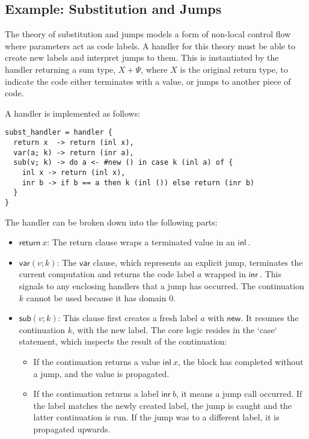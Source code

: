 \documentclass{article}
\theoremstyle{definition}
\theoremstyle{remark}
\newcommand\new{\mathsf{new}}
\newcommand\ret[1]{{\mathsf{return} \ #1}}
\newcommand\sub{\mathsf{sub}}
\newcommand\var{\mathsf{var}}
\newcommand\inl[1]{{\mathsf{inl} \ #1}}
\newcommand\inr[1]{{\mathsf{inr} \ #1}}
\begin{document}
\subsection{Example: Substitution and Jumps}

The theory of substitution and jumps models a form of non-local control flow where parameters act as code labels.
A handler for this theory must be able to create new labels and interpret jumps to them.
This is instantiated by the handler returning a sum type, $X + \Psi$, where $X$ is the original return type, to indicate the code either terminates with a value, or jumps to another piece of code.

A handler is implemented as follows:

\begin{lstlisting}
subst_handler = handler {
  return x  -> return (inl x),
  var(a; k) -> return (inr a),
  sub(v; k) -> do a <- #new () in case k (inl a) of {
    inl x -> return (inl x),
    inr b -> if b == a then k (inl ()) else return (inr b)
  }
}
\end{lstlisting}

The handler can be broken down into the following parts:
\begin{itemize}
    \item $\ret{x}$: The return clause wraps a terminated value in an $\inl{}$.
    \item $\var(v; k)$: The $\var$ clause, which represents an explicit jump, terminates the current computation and returns the code label $a$ wrapped in $\inr{}$.
      This signals to any enclosing handlers that a jump has occurred. The continuation $k$ cannot be used because it has domain $0$.
    \item $\sub(v; k)$: This clause first creates a fresh label $a$ with $\new$. It resumes the continuation $k$, with the new label.
      The core logic resides in the `case` statement, which inspects the result of the continuation:
      \begin{itemize}
          \item If the continuation returns a value $\inl x$, the block has completed without a jump, and the value is propagated.
          \item If the continuation returns a label $\inr b$, it means a jump call occurred. If the label matches the newly created label, the jump is caught and the latter continuation is run.
            If the jump was to a different label, it is propagated upwards.
      \end{itemize}
\end{itemize}
\end{document}
